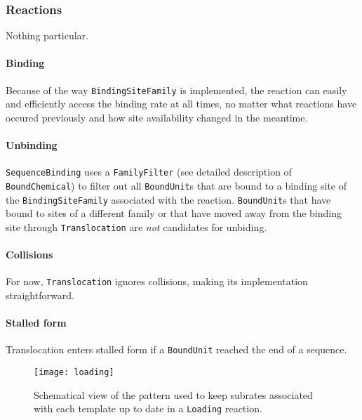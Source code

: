 
\subsubsection{Reactions}


Nothing particular.


\paragraph{Binding} Because of the way \texttt{BindingSiteFamily} is implemented, the reaction can easily and efficiently access the binding rate at all times, no matter what reactions have occured previously and how site availability changed in the meantime.

\paragraph{Unbinding} \texttt{SequenceBinding} uses a \texttt{FamilyFilter} (see detailed description of \texttt{BoundChemical}) to filter out all \texttt{BoundUnit}s that are bound to a binding site of the \texttt{BindingSiteFamily} associated with the reaction. \texttt{BoundUnit}s that have bound to sites of a different family or that have moved away from the binding site through \texttt{Translocation} are \emph{not} candidates for unbiding.


\paragraph{Collisions} For now, \texttt{Translocation} ignores collisions, making its implementation straightforward.

\paragraph{Stalled form} Translocation enters stalled form if a \texttt{BoundUnit} reached the end of a sequence.


\begin{figure}[!h]
  \centering
  \texttt{[image: loading]}
  \caption{Schematical view of the pattern used to keep subrates associated with each template up to date in a \texttt{Loading} reaction.}
  \label{fig:det_loading}
\end{figure}

